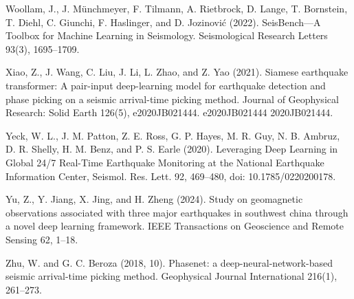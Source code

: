 Woollam, J., J. Münchmeyer, F. Tilmann, A. Rietbrock, D. Lange, T. Bornstein, T. Diehl, C. Giunchi, F. Haslinger, and D. Jozinović (2022). SeisBench—A Toolbox for Machine Learning in Seismology. Seismological Research Letters 93(3), 1695–1709.

Xiao, Z., J. Wang, C. Liu, J. Li, L. Zhao, and Z. Yao (2021). Siamese earthquake transformer: A pair-input deep-learning model for earthquake detection and phase picking on a seismic arrival-time picking method. Journal of Geophysical Research: Solid Earth 126(5), e2020JB021444. e2020JB021444 2020JB021444.

Yeck, W. L., J. M. Patton, Z. E. Ross, G. P. Hayes, M. R. Guy, N. B. Ambruz, D. R. Shelly, H. M. Benz, and P. S. Earle (2020). Leveraging Deep Learning in Global 24/7 Real-Time Earthquake Monitoring at the National Earthquake Information Center, Seismol. Res. Lett. 92, 469–480, doi: 10.1785/0220200178.

Yu, Z., Y. Jiang, X. Jing, and H. Zheng (2024). Study on geomagnetic observations associated with three major earthquakes in southwest china through a novel deep learning framework. IEEE Transactions on Geoscience and Remote Sensing 62, 1–18.

Zhu, W. and G. C. Beroza (2018, 10). Phasenet: a deep-neural-network-based seismic arrival-time picking method. Geophysical Journal International 216(1), 261–273.

